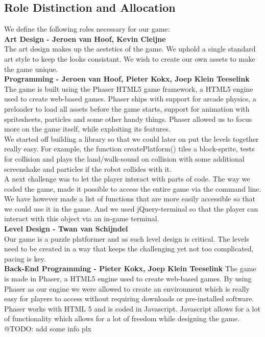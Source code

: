 \documentclass[a4paper,twoside,12pt]{article}
\begin{document}
\subsection{Role Distinction and Allocation}
We define the following roles necessary for our game: \\

\textbf{Art Design - Jeroen van Hoof, Kevin Cleijne} \\
The art design makes up the aestetics of the game. We uphold a single standard art style to keep the looks consistant. We wish to create our own assets to make the game unique.\\

\textbf{Programming - Jeroen van Hoof, Pieter Kokx, Joep Klein Teeselink} \\
The game is built using the Phaser HTML5 game framework, a HTML5 engine used to create web-based games. Phaser ships with support for arcade physics, a preloader to load all assets before the game starts, support for animation with spritesheets, particles and some other handy things. Phaser allowed us to focus more on the game itself, while exploiting its features.\\

We started off building a library so that we could later on put the levels together really easy. For example, the function createPlatform() tiles a block-sprite, tests for collision and plays the land/walk-sound on collision with some additional screenshake and particles if the robot collides with it.\\

A next challenge was to let the player interact with parts of code. The way we coded the game, made it possible to access the entire game via the command line. We have however made a list of functions that are more easily accessible so that we could use it in the game. And we used jQuery-terminal so that the player can interact with this object via an in-game terminal.\\

\textbf{Level Design - Twan van Schijndel} \\
Our game is a puzzle platformer and as such level design is critical. The levels need to be created in a way that keeps the challenging yet not too complicated, pacing is key. \\

\textbf{Back-End Programming - Pieter Kokx, Joep Klein Teeselink}
The game is made in Phaser, a HTML5 engine used to create web-based games. By using Phaser as our engine we were allowed to create an environment which is really easy for players to access without requiring downloads or pre-installed software. Phaser works with HTML 5 and is coded in Javascript. Javascript allows for a lot of functionality which allows for a lot of freedom while designing the game.
@TODO: add some info plx
\end{document}
